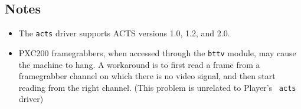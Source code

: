 \subsection*{Notes}

\begin{itemize}
\item The {\tt acts} driver supports ACTS versions 1.0, 1.2, and 2.0.
\item PXC200 framegrabbers, when accessed through the {\tt bttv} module,
may cause the machine to hang.  A workaround is to first read a frame from
a framegrabber channel on which there is no video signal, and then start
reading from the right channel.  (This problem is unrelated to Player's {\tt
acts} driver)
\end{itemize}
